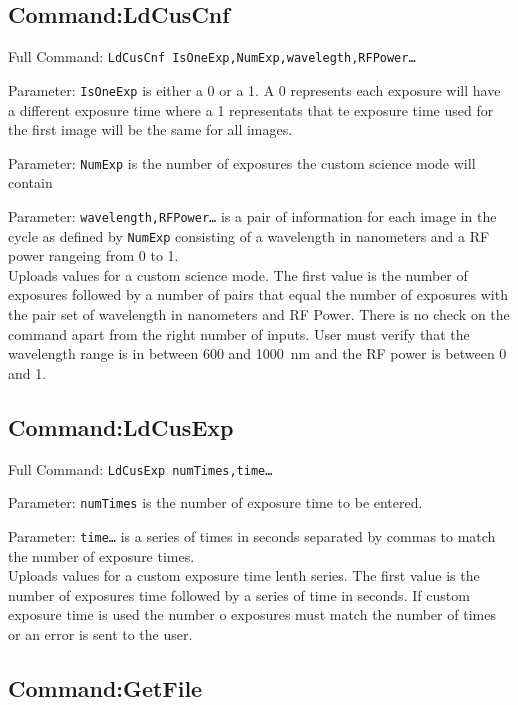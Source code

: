 \subsection{Command:LdCusCnf}

Full Command: \texttt{LdCusCnf IsOneExp,NumExp,wavelegth,RFPower\ldots}

Parameter: \texttt{IsOneExp} is either a 0 or a 1. A 0 represents each exposure will have a different exposure time where a 1 representats that te exposure time used for the first image will be the same for all images.

Parameter: \texttt{NumExp} is the number of exposures the custom science mode will contain

Parameter: \texttt{wavelength,RFPower\ldots} is a pair of information for each image in the cycle as defined by \texttt{NumExp} consisting of a wavelength in nanometers and a RF power rangeing from 0 to 1.\\

Uploads values for a custom science mode. The first value is the number of exposures followed by a number of pairs that equal the number of exposures with the pair set of wavelength in nanometers and RF Power. There is no check on the command apart from the right number of inputs. User must verify that the wavelength range is in between 600 and 1000~nm and the RF power is between 0 and 1.

\subsection{Command:LdCusExp}

Full Command: \texttt{LdCusExp numTimes,time\ldots}

Parameter: \texttt{numTimes} is the number of exposure time to be entered.

Parameter: \texttt{time\ldots} is a series of times in seconds separated by commas to match the number of exposure times.\\

Uploads values for a custom exposure time lenth series. The first value is the number of exposures time followed by a series of time in seconds. If custom exposure time is used the number o exposures must match the number of times or an error is sent to the user.

\subsection{Command:GetFile}

